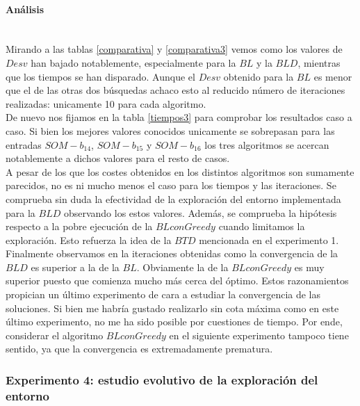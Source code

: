 \documentclass[11pt,a4paper]{article}
\begin{document}
	\paragraph{ Análisis } \ \\
	
	Mirando a las tablas \ref{comparativa} y \ref{comparativa3} vemos como los valores de $Desv$ han bajado notablemente, especialmente para la $BL$ y la $BLD$, mientras que los tiempos se han disparado. Aunque el $Desv$ obtenido para la $BL$ es menor que el de las otras dos búsquedas achaco esto al reducido número de iteraciones realizadas: unicamente 10 para cada algoritmo.  \\ 
	
	De nuevo nos fijamos en la tabla \ref{tiempos3} para comprobar los resultados caso a caso. Si bien los mejores valores conocidos unicamente se sobrepasan para las entradas $SOM-b_14$, $SOM-b_15$ y $SOM-b_16$ los tres algoritmos se acercan notablemente a dichos valores para el resto de casos. \\
	
	A pesar de los que los costes obtenidos en los distintos algoritmos son sumamente parecidos, no es ni mucho menos el caso para los tiempos y las iteraciones. Se comprueba sin duda la efectividad de la exploración del entorno implementada para la $BLD$ observando los estos valores. Además, se comprueba la hipótesis respecto a la pobre ejecución de la $BL con Greedy$ cuando limitamos la exploración. Esto refuerza la idea de la $BTD$ mencionada en el experimento 1. \\
	
	Finalmente observamos en la iteraciones obtenidas como la convergencia de la $BLD$ es superior a la de la $BL$. Obviamente la de la $BL con Greedy$ es muy superior puesto que comienza mucho más cerca del óptimo. Estos razonamientos propician un último experimento de cara a estudiar la convergencia de las soluciones. Si bien me habría gustado realizarlo sin cota máxima como en este último experimento, no me ha sido posible por cuestiones de tiempo. Por ende, considerar el algoritmo $BL con Greedy$ en el siguiente experimento tampoco tiene sentido, ya que la convergencia es extremadamente prematura. 	
		
	\subsubsection{ Experimento 4: estudio evolutivo de la exploración del entorno }
	
\end{document}
